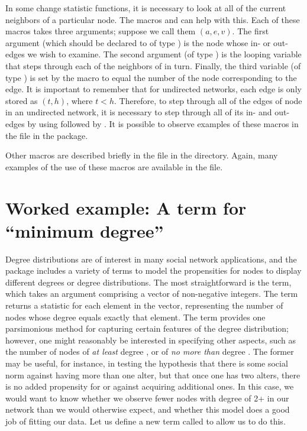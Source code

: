 \documentclass[nojss]{jss}
\begin{document}
In some change statistic functions, it is necessary to look at all of the current
neighbors of a particular node.  The macros
 and 
can help with this.  Each of these macros takes three arguments; suppose
we call them $(a, e, v)$.  The first argument (which should be declared to of type ) is the node whose in- or out-edges
we wish to examine.  The second argument (of type ) is the looping
variable that steps through each of the neighbors of  in turn.  Finally,
the third variable (of type ) is set by the macro to equal the number of
the node corresponding to the edge.  It is important to remember that for undirected
networks, each edge is only stored as $(t,h)$, where $t<h$.
Therefore, to step
through all of the edges of node  in an undirected network, it is necessary
to step through all of its in- and out-edges by using
followed by
.  It is possible to observe
examples of these macros in the  file in the
 package.

Other macros are described briefly in the file  in the 
directory.  Again, many examples of the use of these macros are available in the
 file.


\section{Worked example: A term for ``minimum degree''}
\label{Example}

Degree distributions are of interest in many social network applications, and the  package
includes a variety of terms to model the propensities for nodes to display different degrees or degree distributions.  The most straightforward is the  term, which takes an argument comprising a vector of non-negative integers. The term returns a statistic for each element in the vector, representing the number of nodes whose degree equals exactly that element.  The  term provides one parsimonious method for capturing certain features of the degree distribution; however, one might reasonably be interested in specifying other aspects, such as the number of nodes of {\em at least} degree , or of {\em no more than} degree . The former may be useful, for instance, in testing the hypothesis that there is some social norm against having more than one alter, but that once one has two alters, there is no added propensity for or against acquiring additional ones. In this case, we would want to know whether we observe fewer nodes with degree of 2+ in our network than we would otherwise expect, and whether this model does a good job of fitting our data.  Let us define a new  term called  to allow us to do this.
\end{document}
